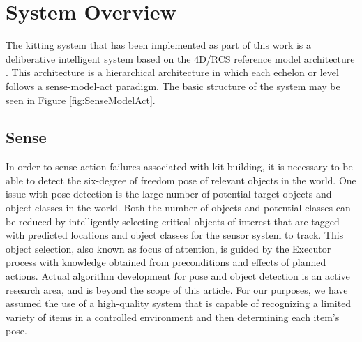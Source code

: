 \section{System Overview}
\label{sect:overview}
The kitting system that has been implemented as part of this work is a deliberative intelligent system based on the 4D/RCS 
reference model architecture \cite{Albus2000}. This architecture is a hierarchical architecture in which each echelon or level
follows a sense-model-act paradigm. The basic structure of the system may be seen in Figure \ref{fig:SenseModelAct}.
%
\subsection{Sense}
\label{subsection:Sense}
In order to sense action failures associated with kit building, it is necessary to be able to detect the six-degree of freedom pose of relevant objects in the
world. One issue with pose detection is the large number of potential target objects and object classes in the world. 
Both the number of objects and potential classes can be reduced by intelligently
selecting critical objects of interest that are tagged with predicted locations and object classes for the sensor system to track. This object selection, 
also known as focus of attention, is guided by
the Executor process with knowledge obtained from preconditions and effects of planned actions.
Actual algorithm development for pose and object detection is an active research area, and is beyond the scope of this article. 
For our purposes, 
we have assumed the use of a high-quality
system that is capable of recognizing a limited variety of items in a controlled environment and then determining each item's pose. 
%
